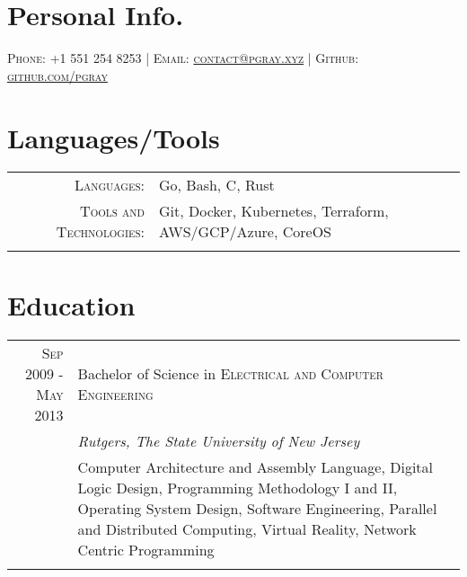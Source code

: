 \documentclass[a4paper, 10pt, onepage]{article} %
\begin{document}
\pagestyle{empty} 
\par{\par}
\par{\par}

\section{Personal Info.}
\centering\textsc{{Phone:} +1 551 254 8253 | {Email:}  \href{mailto:contact@pgray.xyz}{contact@pgray.xyz} | {Github:}  \href{http://github.com/pgray}{github.com/pgray}}\\

\section{Languages/Tools}
\begin{tabular}{rp{10cm}}
\textsc{Languages:} & Go, Bash, C, Rust\\
\textsc{Tools and Technologies:} & Git, Docker, Kubernetes, Terraform, AWS/GCP/Azure, CoreOS\\
\multicolumn{2}{c}{}\\
\end{tabular}

\section{Education}
\begin{tabular}{r|p{10cm}}	
\textsc{Sep 2009 - May 2013} & Bachelor of Science in \textsc{Electrical and Computer Engineering}\\
& \small\emph{Rutgers, The State University of New Jersey}\\
& \footnotesize{Computer Architecture and Assembly Language, Digital Logic Design, Programming Methodology I and II, Operating System Design, Software Engineering, Parallel and Distributed Computing, Virtual Reality, Network Centric Programming}\\
\multicolumn{2}{c}{}\\
\end{tabular}
\end{document}
